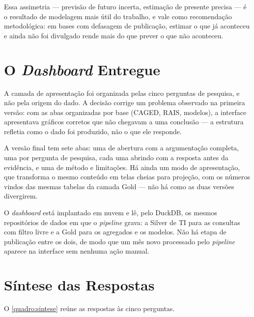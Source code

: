 Essa assimetria --- previsão de futuro incerta, estimação de presente precisa --- é o resultado de modelagem mais útil do trabalho, e vale como recomendação metodológica: em bases com defasagem de publicação, estimar o que já aconteceu e ainda não foi divulgado rende mais do que prever o que não aconteceu.

\section{O \textit{Dashboard} Entregue}

A camada de apresentação foi organizada pelas cinco perguntas de pesquisa, e não pela origem do dado. A decisão corrige um problema observado na primeira versão: com as abas organizadas por base (CAGED, RAIS, modelos), a interface apresentava gráficos corretos que não chegavam a uma conclusão --- a estrutura refletia como o dado foi produzido, não o que ele responde.

A versão final tem sete abas: uma de abertura com a argumentação completa, uma por pergunta de pesquisa, cada uma abrindo com a resposta antes da evidência, e uma de método e limitações. Há ainda um modo de apresentação, que transforma o mesmo conteúdo em telas cheias para projeção, com os números vindos das mesmas tabelas da camada Gold --- não há como as duas versões divergirem.

O \textit{dashboard} está implantado em nuvem e lê, pelo DuckDB, os mesmos repositórios de dados em que o \textit{pipeline} grava: a Silver de TI para as consultas com filtro livre e a Gold para os agregados e os modelos. Não há etapa de publicação entre os dois, de modo que um mês novo processado pelo \textit{pipeline} aparece na interface sem nenhuma ação manual.

\section{Síntese das Respostas}

O \autoref{quadro:sintese} reúne as respostas às cinco perguntas.

